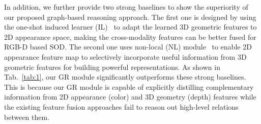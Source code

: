 \documentclass[runningheads]{llncs}
\begin{document}
In addition, we further provide two strong baselines to show the superiority of our proposed graph-based reasoning approach. The first one is designed by using the one-shot induced learner (IL)~\cite{bertinetto2016learning,nie2018human} to adapt the learned 3D geometric features to 2D appearance space, making the cross-modality features can be better fused for RGB-D based SOD. The second one uses non-local (NL) module~\cite{wang2018non} to enable 2D appearance feature map to selectively incorporate useful information from 3D geometric features for building powerful representations. As shown in Tab.~\ref{tab:1}, our GR module significantly outperforms these strong baselines. This is because our GR module is capable of explicitly distilling complementary information from 2D appearance (color) and 3D geometry (depth) features while the existing feature fusion approaches fail to reason out high-level relations between them. 
\end{document}
